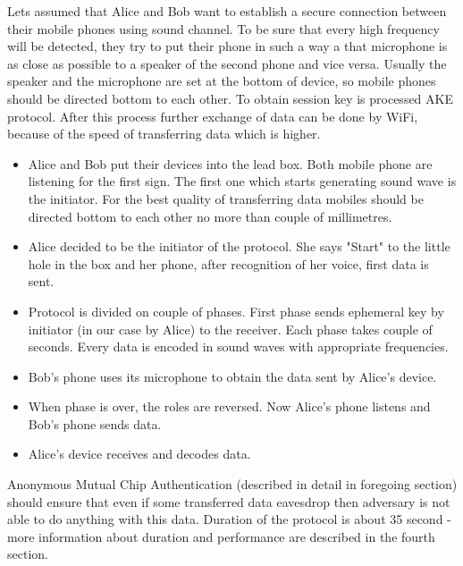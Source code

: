 \documentclass[11pt,titlepage]{article}
\theoremstyle{plain}
\begin{document}
Lets assumed that Alice and Bob want to establish a secure connection between their mobile phones using sound channel. To be sure that every high frequency will be detected, they try to put their phone in such a way a that microphone is as close as possible to a speaker of the second phone and vice versa. Usually the speaker and the microphone are set at the bottom of device, so mobile phones should be directed bottom to each other. To obtain session key is processed AKE protocol. After this process further exchange of data can be done by WiFi, because of the speed of transferring data which is higher. 

\vspace{5mm}

\begin{itemize}
	\item Alice and Bob put their devices into the lead box. Both mobile phone are listening for the first sign. The first one which starts generating sound wave is the initiator. For the best quality of transferring data mobiles should be directed bottom to each other no more than couple of millimetres.
	\item Alice decided to be the initiator of the protocol. She says "Start" to the little hole in the box and her phone, after recognition of her voice, first data is sent.
	\item Protocol is divided on couple of phases. First phase sends ephemeral key by initiator (in our case by Alice) to the receiver. Each phase takes couple of seconds. Every data is encoded in sound waves with appropriate frequencies.
	\item Bob's phone uses its microphone to obtain the data sent by Alice's device.
	\item When phase is over, the roles are reversed. Now Alice's phone  listens and Bob's phone sends data.
	\item Alice's device receives and decodes data.
\end{itemize}

Anonymous Mutual Chip Authentication (described in detail in foregoing section) should ensure that even if some transferred data eavesdrop then adversary is not able to do anything with this data. Duration of the protocol is about 35 second - more information about duration and performance are described in the fourth section.
\end{document}
